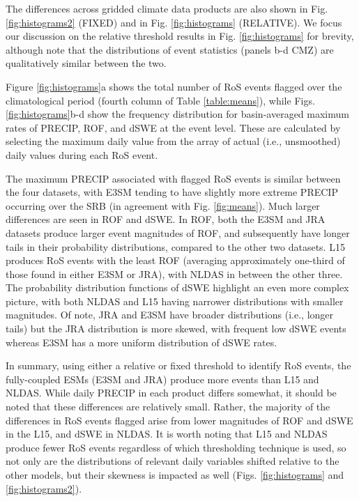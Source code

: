 \documentclass[nhess, manuscript]{copernicus}
\begin{document}
The differences across gridded climate data products are also shown in Fig. \ref{fig:histograms2} (FIXED) and in Fig. \ref{fig:histograms} (RELATIVE). We focus our discussion on the relative threshold results in Fig. \ref{fig:histograms} for brevity, although note that the distributions of event statistics (panels b-d CMZ) are qualitatively similar between the two.

Figure \ref{fig:histograms}a shows the total number of RoS events flagged over the climatological period (fourth column of Table \ref{table:means}), while Figs. \ref{fig:histograms}b-d show the frequency distribution for basin-averaged maximum rates of PRECIP, ROF, and dSWE at the event level. These are calculated by selecting the maximum daily value from the array of actual (i.e., unsmoothed) daily values during each RoS event.

The maximum PRECIP associated with flagged RoS events is similar between the four datasets, with E3SM tending to have slightly more extreme PRECIP occurring over the SRB (in agreement with Fig. \ref{fig:means}).
Much larger differences are seen in ROF and dSWE.
In ROF, both the E3SM and JRA datasets produce larger event magnitudes of ROF, and subsequently have longer tails in their probability distributions, compared to the other two datasets.
L15 produces RoS events with the least ROF (averaging approximately one-third of those found in either E3SM or JRA), with NLDAS in between the other three.
The probability distribution functions of dSWE highlight an even more complex picture, with both NLDAS and L15 having narrower distributions with smaller magnitudes.
Of note, JRA and E3SM have broader distributions (i.e., longer tails) but the JRA distribution is more skewed, with frequent low dSWE events whereas E3SM has a more uniform distribution of dSWE rates.

In summary, using either a relative or fixed threshold to identify RoS events, the fully-coupled ESMs (E3SM and JRA) produce more events than L15 and NLDAS.
While daily PRECIP in each product differs somewhat, it should be noted that these differences are relatively small.
Rather, the majority of the differences in RoS events flagged arise from lower magnitudes of ROF and dSWE in the L15, and dSWE in NLDAS.
It is worth noting that L15 and NLDAS produce fewer RoS events regardless of which thresholding technique is used, so not only are the distributions of relevant daily variables shifted relative to the other models, but their skewness is impacted as well (Figs. \ref{fig:histograms} and \ref{fig:histograms2}).
\end{document}
